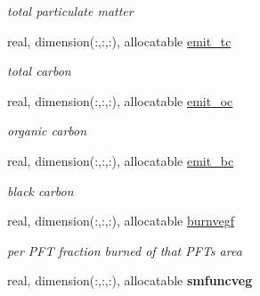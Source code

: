 \begin{DoxyCompactItemize}
\begin{DoxyCompactList}\small\item\em total particulate matter \end{DoxyCompactList}\item 
\hypertarget{structctem__statevars_1_1veg__rot_a8ae15757654dd8c9e3c5842c098dcdff}{}real, dimension(\+:,\+:,\+:), allocatable \hyperlink{structctem__statevars_1_1veg__rot_a8ae15757654dd8c9e3c5842c098dcdff}{emit\+\_\+tc}\label{structctem__statevars_1_1veg__rot_a8ae15757654dd8c9e3c5842c098dcdff}

\begin{DoxyCompactList}\small\item\em total carbon \end{DoxyCompactList}\item 
\hypertarget{structctem__statevars_1_1veg__rot_a53c1d972f45f3e7842272209ee5ada33}{}real, dimension(\+:,\+:,\+:), allocatable \hyperlink{structctem__statevars_1_1veg__rot_a53c1d972f45f3e7842272209ee5ada33}{emit\+\_\+oc}\label{structctem__statevars_1_1veg__rot_a53c1d972f45f3e7842272209ee5ada33}

\begin{DoxyCompactList}\small\item\em organic carbon \end{DoxyCompactList}\item 
\hypertarget{structctem__statevars_1_1veg__rot_ae89b4142bb65251a853feecfd17551ae}{}real, dimension(\+:,\+:,\+:), allocatable \hyperlink{structctem__statevars_1_1veg__rot_ae89b4142bb65251a853feecfd17551ae}{emit\+\_\+bc}\label{structctem__statevars_1_1veg__rot_ae89b4142bb65251a853feecfd17551ae}

\begin{DoxyCompactList}\small\item\em black carbon \end{DoxyCompactList}\item 
\hypertarget{structctem__statevars_1_1veg__rot_ae32805074cf8a0909d11c0007a301ffc}{}real, dimension(\+:,\+:,\+:), allocatable \hyperlink{structctem__statevars_1_1veg__rot_ae32805074cf8a0909d11c0007a301ffc}{burnvegf}\label{structctem__statevars_1_1veg__rot_ae32805074cf8a0909d11c0007a301ffc}

\begin{DoxyCompactList}\small\item\em per P\+F\+T fraction burned of that P\+F\+T\textquotesingle{}s area \end{DoxyCompactList}\item 
\hypertarget{structctem__statevars_1_1veg__rot_a94ba6bad5ce498c5e3787c7d55ebda20}{}real, dimension(\+:,\+:,\+:), allocatable {\bfseries smfuncveg}\label{structctem__statevars_1_1veg__rot_a94ba6bad5ce498c5e3787c7d55ebda20}


\end{DoxyCompactItemize}
